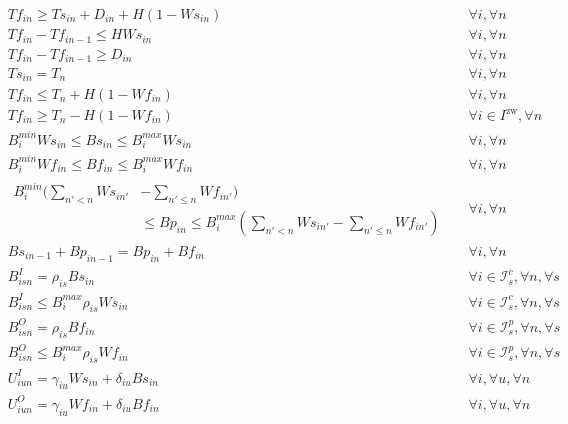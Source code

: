\begin{align}
		  & Tf_{in} \ge Ts_{in} + D_{in} + H(1 - Ws_{in}) && \forall i, \forall n \\
		  & Tf_{in} - Tf_{in-1} \le H Ws_{in} && \forall i, \forall n \\
		  & Tf_{in} - Tf_{in-1} \ge D_{in} && \forall i, \forall n \\
		  & Ts_{in} = T_n && \forall i, \forall n \\
		  & Tf_{in} \le T_n + H(1 - Wf_{in}) && \forall i, \forall n \\
		  & Tf_{in} \ge T_n - H(1 - Wf_{in}) && \forall i \in I^{\text{zw}}, \forall n \\
		  & B_{i}^{min} Ws_{in} \le Bs_{in} \le B_{i}^{max} Ws_{in} &&  \forall i, \forall n \\
		  & B_{i}^{min} Wf_{in} \le Bf_{in} \le B_{i}^{max} Wf_{in} &&  \forall i, \forall n \\
&\begin{aligned}
		   B_{i}^{min} (\sum_{n' < n} Ws_{in'} & - \sum_{n' \le n} Wf_{in'})\\ &\le Bp_{in} \le B_{i}^{max}  (\sum_{n' < n} Ws_{in'} - \sum_{n' \le n} Wf_{in'})  
\end{aligned}  && \forall i, \forall n \\
		  &Bs_{in-1} + Bp_{in-1} = Bp_{in} + Bf_{in} && \forall i, \forall n \\
		  &B_{isn}^I = \rho_{is} Bs_{in} && \forall i \in \mathcal{I}_{s}^c, \forall n, \forall s \\
		  &B_{isn}^I \le B_{i}^{max} \rho_{is} Ws_{in}  && \forall i \in \mathcal{I}_{s}^c, \forall n, \forall s \\
		  &B_{isn}^O = \rho_{is} Bf_{in} && \forall i \in \mathcal{I}_{s}^p, \forall n, \forall s \\
		  &B_{isn}^O \le B_{i}^{max} \rho_{is} Wf_{in}  && \forall i \in \mathcal{I}_{s}^p, \forall n, \forall s \\
		  &U_{iun}^{I} = \gamma_{iu} Ws_{in} + \delta_{iu} Bs_{in} && \forall i, \forall u, \forall n \\
		  &U_{iun}^{O} = \gamma_{iu} Wf_{in} + \delta_{iu} Bf_{in} && \forall i, \forall u, \forall n
\end{align}

